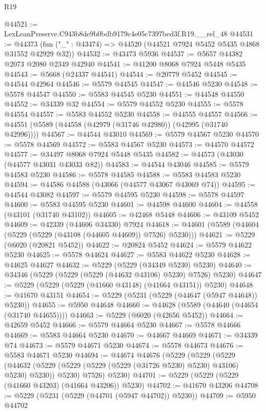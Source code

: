 \begin{lexlean}{R19}
\begin{coremodule}
@44521 := LexLeanPreserve.C943b8de9b0bdb9179c4e05c7397bed3f.R19.__rel_48
@44531 := @44373 (fun ("_" : @43474) => @44520 (@44521 @7924 @5452 @5435 @4868 @31552 @42929 @32))
@44532 := @43473 @5936
@44537 := @5657 @44382 @2073 @2080 @2349 @42940
@44541 := @41200 @8068 @7924 @5448 @5435
@44543 := @5668 (@24337 @44541)
@44544 := @20779 @5452
@44545 := @44544 @42964
@44546 := @5579 @44545
@44547 := @44546 @5230
@44548 := @5578 @44547
@44550 := @5583 @44545 @5230
@44551 := @44548 @44550
@44552 := @34339 @32
@44554 := @5579 @44552 @5230
@44555 := @5578 @44554
@44557 := @5583 @44552 @5230
@44558 := @44555 @44557
@44566 := @44551 (@5589 (@44558 (@42979 (@31746 @42980)) (@42995 (@31740 @42996))))
@44567 := @44544 @43010
@44569 := @5579 @44567 @5230
@44570 := @5578 @44569
@44572 := @5583 @44567 @5230
@44573 := @44570 @44572
@44577 := @34497 @8068 @7924 @5448 @5435
@44582 := @44573 (@43030 (@44577 @43031 @43033 @82))
@44583 := @44544 @43046
@44585 := @5579 @44583 @5230
@44586 := @5578 @44585
@44588 := @5583 @44583 @5230
@44594 := @44586 @44588 (@43066 (@44577 @43067 @43069 @74))
@44595 := @44544 @43082
@44597 := @5579 @44595 @5230
@44598 := @5578 @44597
@44600 := @5583 @44595 @5230
@44601 := @44598 @44600
@44604 := @44558 (@43101 (@31740 @43102))
@44605 := @42468 @5448
@44606 := @43109 @5452
@44609 := @42339 (@44606 @34330) @7924
@44618 := @44601 (@5589 (@44604 (@5229 (@5229 (@43108 (@44605 @44609)) @7526) @5230)))
@44621 := @5229 (@6020 (@20821 @5452))
@44622 := @20824 @5452
@44624 := @5579 @44622 @5230
@44625 := @5578 @44624
@44627 := @5583 @44622 @5230
@44628 := @44625 @44627
@44632 := @5229 (@5229 (@34349 @5230) @5230)
@44640 := @34346 (@5229 (@5229 (@5229 (@44632 @43106) @5230) @7526) @5230)
@44647 := @5229 (@5229 (@5229 (@41660 @43148) (@41664 @43151)) @5230)
@44648 := @41670 @43151
@44654 := @5229 (@5231 (@5229 (@44647 (@5947 @44648)) @5230))
@44655 := @5950 @44648
@44660 := @44628 (@5589 (@44640 (@44654 (@31740 @44655))))
@44663 := @5229 (@6020 (@42656 @5452))
@44664 := @42659 @5452
@44666 := @5579 @44664 @5230
@44667 := @5578 @44666
@44669 := @5583 @44664 @5230
@44670 := @44667 @44669
@44671 := @34339 @74
@44673 := @5579 @44671 @5230
@44674 := @5578 @44673
@44676 := @5583 @44671 @5230
@44694 := @44674
    @44676
    (@5229
      (@5229
        (@5229
          (@44632 (@5229 (@5229 (@5229 (@5229 (@31726 @5230) @5230) @43106) @5230) @5230))
          @5230)
        @7526)
      @5230)
@44701 := @5229 (@5229 (@5229 (@41660 @43203) (@41664 @43206)) @5230)
@44702 := @41670 @43206
@44708 := @5229 (@5231 (@5229 (@44701 (@5947 @44702)) @5230))
@44709 := @5950 @44702

\end{coremodule}
\end{lexlean}
